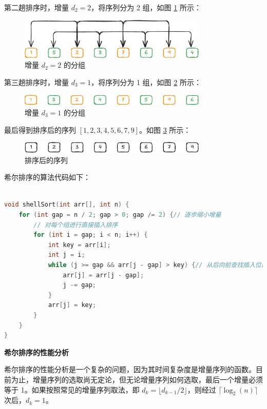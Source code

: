 \documentclass[lang=cn,newtx,10pt,scheme=chinese]{elegantbook}
\begin{document}
第二趟排序时，增量 $d_2 = 2$，将序列分为 2 组，如图 \ref{fig:shellSort2} 所示：
\begin{figure}[h!]
    \centering
    \includegraphics[width=0.8\textwidth]{./figure/pdf/cropped/shell(b).pdf}
    \caption{增量 $d_2 = 2$ 的分组}
    \label{fig:shellSort2}
\end{figure}

第三趟排序时，增量 $d_3 = 1$，将序列分为 1 组，如图 \ref{fig:shellSort3} 所示：
\begin{figure}[h!]
    \centering
    \includegraphics[width=0.8\textwidth]{./figure/pdf/cropped/shell(c).pdf}
    \caption{增量 $d_3 = 1$ 的分组}
    \label{fig:shellSort3}
\end{figure}

最后得到排序后的序列 $[1,2,3,4,5,6,7,9]$。如图 \ref{fig:shellSort4} 所示：
\begin{figure}[h!]
    \centering
    \includegraphics[width=0.8\textwidth]{./figure/pdf/cropped/shell(d).pdf}
    \caption{排序后的序列}
    \label{fig:shellSort4}
\end{figure}

希尔排序的算法代码如下：
\begin{lstlisting}[language=C++, caption=希尔排序的算法代码]

void shellSort(int arr[], int n) {
    for (int gap = n / 2; gap > 0; gap /= 2) {// 逐步缩小增量
        // 对每个组进行直接插入排序
        for (int i = gap; i < n; i++) {
            int key = arr[i];
            int j = i;
            while (j >= gap && arr[j - gap] > key) {// 从后向前查找插入位置
                arr[j] = arr[j - gap];
                j -= gap;
            }
            arr[j] = key;
        }
    }
}

\end{lstlisting}

\textbf{希尔排序的性能分析}

希尔排序的性能分析是一个复杂的问题，因为其时间复杂度是增量序列的函数。目前为止，增量序列的选取尚无定论，但无论增量序列如何选取，最后一个增量必须等于 1。如果按照常见的增量序列取法，即 $d_k = \lfloor d_{k-1} / 2 \rfloor$，则经过 $\lceil \log_2(n) \rceil$ 次后，$d_k = 1$。
\end{document}

